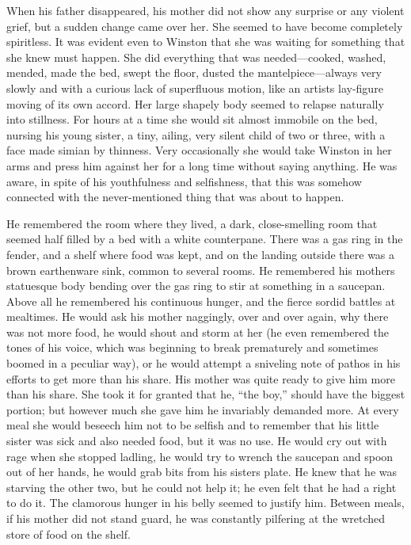 When his father disappeared, his mother did not show any surprise or any
violent grief, but a sudden change came over her. She seemed to have
become completely spiritless. It was evident even to Winston that she
was waiting for something that she knew must happen. She did everything
that was needed---cooked, washed, mended, made the bed, swept the floor,
dusted the mantelpiece---always very slowly and with a curious lack of
superfluous motion, like an artist\textquotesingle s lay-figure moving
of its own accord. Her large shapely body seemed to relapse naturally
into stillness. For hours at a time she would sit almost immobile on the
bed, nursing his young sister, a tiny, ailing, very silent child of two
or three, with a face made simian by thinness. Very occasionally she
would take Winston in her arms and press him against her for a long time
without saying anything. He was aware, in spite of his youthfulness and
selfishness, that this was somehow connected with the never-mentioned
thing that was about to happen.

He remembered the room where they lived, a dark, close-smelling room
that seemed half filled by a bed with a white counterpane. There was a
gas ring in the fender, and a shelf where food was kept, and on the
landing outside there was a brown earthenware sink, common to several
rooms. He remembered his mother\textquotesingle s statuesque body
bending over the gas ring to stir at something in a saucepan. Above all
he remembered his continuous hunger, and the fierce sordid battles at
mealtimes. He would ask his mother naggingly, over and over again, why
there was not more food, he would shout and storm at her (he even
remembered the tones of his voice, which was beginning to break
prematurely and sometimes boomed in a peculiar way), or he would attempt
a sniveling note of pathos in his efforts to get more than his share.
His mother was quite ready to give him more than his share. She took it
for granted that he, ``the boy,'' should have the biggest portion; but
however much she gave him he invariably demanded more. At every meal she
would beseech him not to be selfish and to remember that his little
sister was sick and also needed food, but it was no use. He would cry
out with rage when she stopped ladling, he would try to wrench the
saucepan and spoon out of her hands, he would grab bits from his
sister\textquotesingle s plate. He knew that he was starving the other
two, but he could not help it; he even felt that he had a right to do
it. The clamorous hunger in his belly seemed to justify him. Between
meals, if his mother did not stand guard, he was constantly pilfering at
the wretched store of food on the shelf.

